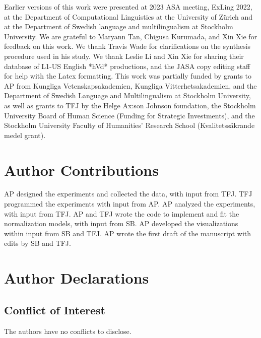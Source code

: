 \documentclass[preprint]{JASA}
\begin{document}
\begin{acknowledgments}
Earlier versions of this work were presented at 2023 ASA meeting, ExLing 2022, at the Department of Computational Linguistics at the University of Zürich and at the Department of Swedish language and multilingualism at Stockholm University. We are grateful to Maryann Tan, Chigusa Kurumada, and Xin Xie for feedback on this work. We thank Travis Wade for clarifications on the synthesis procedure used in his study. We thank Leslie Li and Xin Xie for sharing their database of L1-US English *hVd* productions, and the JASA copy editing staff for help with the Latex formatting. This work was partially funded by grants to AP from Kungliga Vetenskapsakademien, Kungliga Vitterhetsakademien, and the Department of Swedish Language and Multilingualism at Stockholm University, as well as grants to TFJ by the Helge Ax:son Johnson foundation, the Stockholm University Board of Human Science (Funding for Strategic Investments), and the Stockholm University Faculty of Humanities’ Research School (Kvalitetssäkrande medel grant).
\end{acknowledgments}

\section*{Author Contributions}\label{author-contributions}

AP designed the experiments and collected the data, with input from TFJ. TFJ programmed the experiments with input from AP. AP analyzed the experiments, with input from TFJ. AP and TFJ wrote the code to implement and fit the normalization models, with input from SB. AP developed the visualizations within input from SB and TFJ. AP wrote the first draft of the manuscript with edits by SB and TFJ.

\section*{Author Declarations}\label{author-declarations}

\subsection*{Conflict of Interest}\label{conflict-of-interest}

The authors have no conflicts to disclose.
\end{document}
